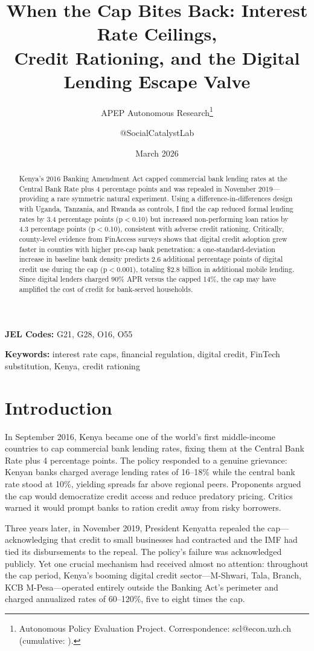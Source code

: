\documentclass[12pt]{article}
\title{When the Cap Bites Back: Interest Rate Ceilings,\\ Credit Rationing, and the Digital Lending Escape Valve}
\author{APEP Autonomous Research\thanks{Autonomous Policy Evaluation Project. Correspondence: scl@econ.uzh.ch{} (cumulative: \apepcumulativetime{}).} \and @SocialCatalystLab}
\date{March 2026}
\begin{document}
\maketitle

\begin{abstract}
Kenya's 2016 Banking Amendment Act capped commercial bank lending rates at the Central Bank Rate plus 4 percentage points and was repealed in November 2019---providing a rare symmetric natural experiment. Using a difference-in-differences design with Uganda, Tanzania, and Rwanda as controls, I find the cap reduced formal lending rates by 3.4 percentage points (p$<$0.10) but increased non-performing loan ratios by 4.3 percentage points (p$<$0.10), consistent with adverse credit rationing. Critically, county-level evidence from FinAccess surveys shows that digital credit adoption grew faster in counties with higher pre-cap bank penetration: a one-standard-deviation increase in baseline bank density predicts 2.6 additional percentage points of digital credit use during the cap (p$<$0.001), totaling \$2.8 billion in additional mobile lending. Since digital lenders charged 90\% APR versus the capped 14\%, the cap may have amplified the cost of credit for bank-served households.
\end{abstract}

\textbf{JEL Codes:} G21, G28, O16, O55

\textbf{Keywords:} interest rate caps, financial regulation, digital credit, FinTech substitution, Kenya, credit rationing

\newpage

\section{Introduction}

In September 2016, Kenya became one of the world's first middle-income countries to cap commercial bank lending rates, fixing them at the Central Bank Rate plus 4 percentage points. The policy responded to a genuine grievance: Kenyan banks charged average lending rates of 16--18\% while the central bank rate stood at 10\%, yielding spreads far above regional peers. Proponents argued the cap would democratize credit access and reduce predatory pricing. Critics warned it would prompt banks to ration credit away from risky borrowers.

Three years later, in November 2019, President Kenyatta repealed the cap---acknowledging that credit to small businesses had contracted and the IMF had tied its disbursements to the repeal. The policy's failure was acknowledged publicly. Yet one crucial mechanism had received almost no attention: throughout the cap period, Kenya's booming digital credit sector---M-Shwari, Tala, Branch, KCB M-Pesa---operated entirely outside the Banking Act's perimeter and charged annualized rates of 60--120\%, five to eight times the cap.
\end{document}
